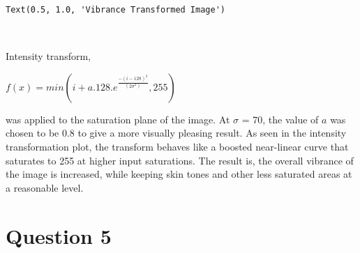 \documentclass[11pt]{article}
\makeatletter
\newcommand{\boxspacing}{\kern\kvtcb@left@rule\kern\kvtcb@boxsep}
\newcommand{\prompt}[4]{
        {\ttfamily\llap{{\color{#2}[#3]:\hspace{3pt}#4}}\vspace{-\baselineskip}}
    }
\makeatother
\begin{document}
            \begin{tcolorbox}[breakable, size=fbox, boxrule=.5pt, pad at break*=1mm, opacityfill=0]
\prompt{Out}{outcolor}{59}{\boxspacing}
\begin{Verbatim}[commandchars=\\\{\}]
Text(0.5, 1.0, 'Vibrance Transformed Image')
\end{Verbatim}
\end{tcolorbox}
        
    \begin{center}
    \end{center}
    { \hspace*{\fill} \\}
    
    Intensity transform,

\(f(x) = min(i + a.128.e^{\frac{-(i-128)^2}{(2\sigma^2)}}, 255)\)

was applied to the saturation plane of the image. At \(\sigma\) = 70,
the value of \(a\) was chosen to be 0.8 to give a more visually pleasing
result. As seen in the intensity transformation plot, the transform
behaves like a boosted near-linear curve that saturates to 255 at higher
input saturations. The result is, the overall vibrance of the image is
increased, while keeping skin tones and other less saturated areas at a
reasonable level.

    \section{Question 5}\label{question-5}
\end{document}
